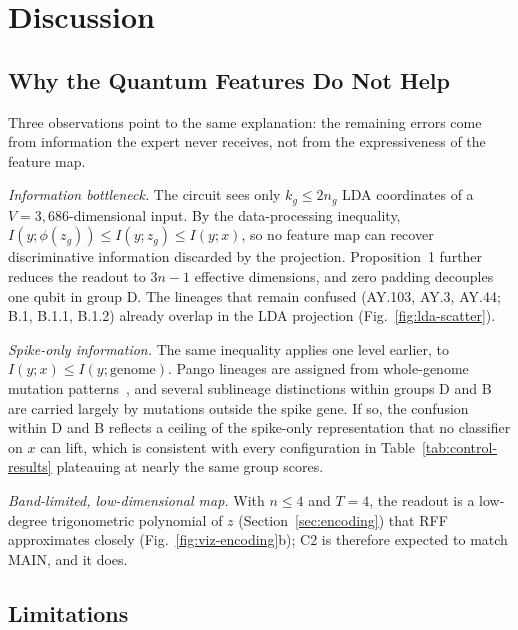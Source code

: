 \documentclass[conference]{IEEEtran}
\begin{document}
\section{Discussion}
\label{sec:discussion}

\subsection{Why the Quantum Features Do Not Help}
\label{sec:why}

Three observations point to the same explanation: the remaining errors come from information the expert never receives, not from the expressiveness of the feature map.

\textit{Information bottleneck.} The circuit sees only $k_g\le2n_g$ LDA coordinates of a $V=3{,}686$-dimensional input. By the data-processing inequality, $I(y;\phi(z_g))\le I(y;z_g)\le I(y;x)$, so no feature map can recover discriminative information discarded by the projection. Proposition~1 further reduces the readout to $3n-1$ effective dimensions, and zero padding decouples one qubit in group D. The lineages that remain confused (AY.103, AY.3, AY.44; B.1, B.1.1, B.1.2) already overlap in the LDA projection (Fig.~\ref{fig:lda-scatter}).

\textit{Spike-only information.} The same inequality applies one level earlier, to $I(y;x)\le I(y;\text{genome})$. Pango lineages are assigned from whole-genome mutation patterns~\cite{rambaut2020pango,otoole2021pangolin}, and several sublineage distinctions within groups D and B are carried largely by mutations outside the spike gene.
If so, the confusion within D and B reflects a ceiling of the spike-only representation that no classifier on $x$ can lift, which is consistent with every configuration in Table~\ref{tab:control-results} plateauing at nearly the same group scores.

\textit{Band-limited, low-dimensional map.} With $n\le4$ and $T=4$, the readout is a low-degree trigonometric polynomial of $z$ (Section~\ref{sec:encoding}) that RFF approximates closely (Fig.~\ref{fig:viz-encoding}b); C2 is therefore expected to match MAIN, and it does.

\subsection{Limitations}
\label{sec:limitations}
\end{document}
